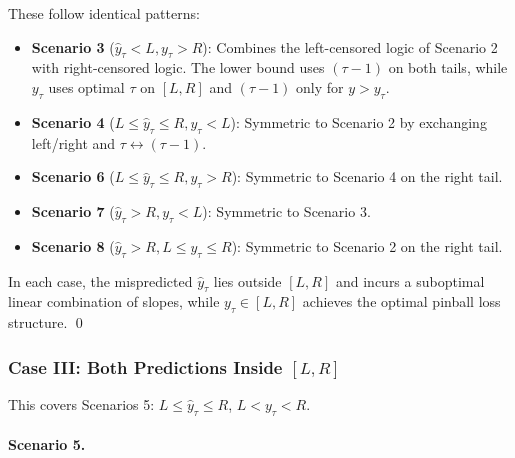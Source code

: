 \documentclass[sigconf]{acmart}
\begin{document}
These follow identical patterns:
\begin{itemize}
    \item \textbf{Scenario 3} ($\hat{y}_\tau < L, y_\tau > R$): Combines the left-censored logic of Scenario 2 with right-censored logic. The lower bound uses $(\tau-1)$ on both tails, while $y_\tau$ uses optimal $\tau$ on $[L,R]$ and $(\tau-1)$ only for $y>y_\tau$.
    
    \item \textbf{Scenario 4} ($L \le \hat{y}_\tau \le R, y_\tau < L$): Symmetric to Scenario 2 by exchanging left/right and $\tau \leftrightarrow (\tau-1)$.
    
    \item \textbf{Scenario 6} ($L \le \hat{y}_\tau \le R, y_\tau > R$): Symmetric to Scenario 4 on the right tail.
    
    \item \textbf{Scenario 7} ($\hat{y}_\tau > R, y_\tau < L$): Symmetric to Scenario 3.
    
    \item \textbf{Scenario 8} ($\hat{y}_\tau > R, L \le y_\tau \le R$): Symmetric to Scenario 2 on the right tail.
\end{itemize}
In each case, the mispredicted $\hat{y}_\tau$ lies outside $[L,R]$ and incurs a suboptimal linear combination of slopes, while $y_\tau \in [L,R]$ achieves the optimal pinball loss structure. \qed

\subsubsection[Case III: Both Predictions Inside {[L,R]}]
{Case III: Both Predictions Inside $[{L,R}]$}

This covers Scenarios 5: $L \le \hat{y}_\tau \le R$, $L < y_\tau < R$.

\paragraph{Scenario 5.}
\end{document}
